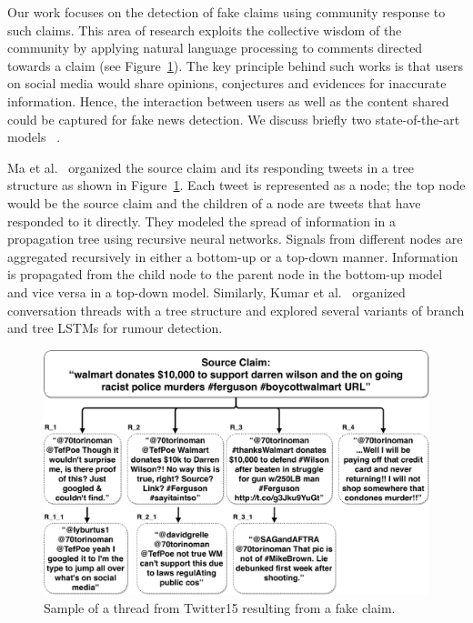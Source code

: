 \documentclass[letterpaper]{article} %
\begin{document}
Our work focuses on the detection of fake claims using community response to such claims. This area of research exploits the collective wisdom of the community by applying natural language processing to comments directed towards a claim (see Figure~\ref{fig:proptree}). The key principle behind such works is that users on social media would share opinions, conjectures and evidences for inaccurate information. Hence, the interaction between users as well as the content shared could be captured for fake news detection. We discuss briefly two state-of-the-art models ~\citep{ma18,kumar19}.

Ma et al.~ organized the source claim and its responding tweets in a tree structure as shown in Figure~\ref{fig:proptree}. Each tweet is represented as a node; the top node would be the source claim and the children of a node are tweets that have responded to it directly. They modeled the spread of information in a propagation tree using recursive neural networks. Signals from different nodes are aggregated recursively in either a bottom-up or a top-down manner. Information is propagated from the child node to the parent node in the bottom-up model and vice versa in a top-down model.
Similarly, Kumar et al.~ organized conversation threads with a tree structure and explored several variants of branch and tree LSTMs for rumour detection.

\begin{figure}[t]
\centering
    \includegraphics[width= 0.98\columnwidth]{prop_tree.pdf}
\caption{Sample of a thread from Twitter15 resulting from a fake claim.}
\label{fig:proptree}
\end{figure}
\end{document}
